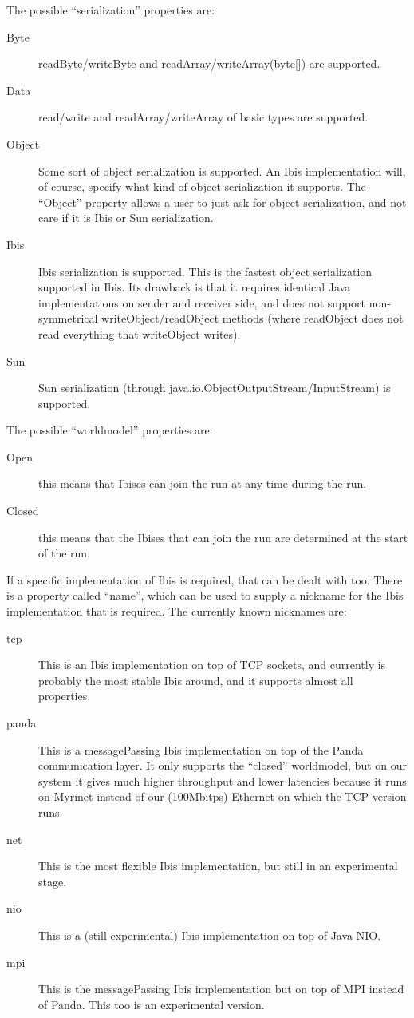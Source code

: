 \documentclass[10pt]{article}
\begin{document}
The possible ``serialization'' properties are:
\begin{description}
\item[Byte]
readByte/writeByte and readArray/writeArray(byte[]) are supported.
\item[Data]
read/write and readArray/writeArray of basic types are supported.
\item[Object]
Some sort of object serialization is supported. An Ibis implementation
will, of course, specify what kind of object serialization it supports.
The ``Object'' property allows a user to just ask for object
serialization, and not care if it is Ibis or Sun serialization.
\item[Ibis]
Ibis serialization is supported.
This is the fastest object serialization supported in Ibis. Its drawback
is that it requires identical Java implementations on sender and
receiver side, and does not support
non-symmetrical writeObject/readObject methods (where readObject does not
read everything that writeObject writes).
\item[Sun]
Sun serialization (through java.io.ObjectOutputStream/InputStream) is
supported.
\end{description}

The possible ``worldmodel'' properties are:
\begin{description}
\item[Open]
this means that Ibises can join the run at any time during the run.
\item[Closed]
this means that the Ibises that can join the run are determined
at the start of the run.
\end{description}

If a specific implementation of Ibis is required, that can be dealt with too.
There is a property called ``name'', which can be used to supply a nickname
for the Ibis implementation that is required.
The currently known nicknames are:
\begin{description}
\item[tcp]
This is an Ibis implementation on top of TCP sockets, and currently is
probably the most stable Ibis around, and it supports almost all properties.
\item[panda]
This is a messagePassing Ibis implementation on top of the Panda
communication layer. It only supports the ``closed'' worldmodel,
but on our system it gives much higher throughput and lower latencies
because it runs on Myrinet instead of our (100Mbitps) Ethernet on which
the TCP version runs.
\item[net]
This is the most flexible Ibis implementation, but still in an experimental
stage.
\item[nio]
This is a (still experimental) Ibis implementation on top of Java NIO.
\item[mpi]
This is the messagePassing Ibis implementation but on top of MPI instead
of Panda. This too is an experimental version.
\end{description}
\end{document}
